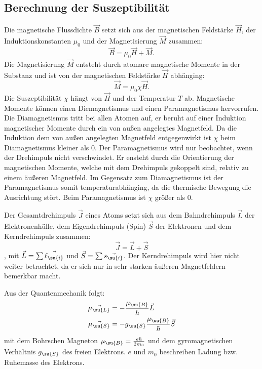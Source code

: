 \subsection{Berechnung der Suszeptibilität}
Die magnetische Flussdichte $\vec{B}$ setzt sich aus der magnetischen Feldstärke
$\vec{H}$, der Induktionskonstanten $\mu_0$ und der Magnetisierung $\vec{M}$
zusammen:
\begin{equation}
  \vec{B} = \mu_0 \vec{H} + \vec{M}.
\end{equation}
Die Magnetisierung $\vec{M}$ entsteht durch atomare magnetische Momente in der
Substanz und ist von der magnetischen Feldstärke $\vec{H}$ abhänging:
\begin{equation}
  \vec{M} = \mu_0 \chi \vec{H}.
\end{equation}
Die Suszeptibilität $\chi$ hängt von $\vec{H}$ und der Temperatur $T$ ab.
Magnetische Momente können einen Diemagnetismus und einen Paramagnetismus
hervorrufen. Die Diamagnetismus tritt bei allen Atomen auf, er beruht auf einer
Induktion magnetischer Momente durch ein von außen angelegtes Magnetfeld.
Da die Induktion dem von außen angelegten Magnetfeld entgegenwirkt ist $\chi$
beim Diamagnetismus kleiner als 0. Der Paramagnetismus wird nur beobachtet, wenn
der Drehimpuls nicht verschwindet. Er ensteht durch die Orientierung der
magnetischen Momente, welche mit dem Drehimpuls gekoppelt sind, relativ zu einem
äußeren Magnetfeld. Im Gegensatz zum Diamagnetismus ist der Paramagnetismus somit
temperaturabhänging, da die thermische Bewegung die Ausrichtung stört. Beim
Paramagnetismus ist $\chi$ größer als 0.

Der Gesamtdrehimpuls $\vec{J}$ eines Atoms setzt sich aus dem Bahndrehimpuls $\vec{L}$
der Elektronenhülle, dem Eigendrehimpuls (Spin) $\vec{S}$ der Elektronen und dem
Kerndrehimpuls zusammen:
\begin{equation}
  \vec{J} = \vec{L} + \vec{S}
\end{equation}
, mit $\vec{L} = \sum \vec{\ell_\su{i}}$ und $\vec{S} = \sum \vec{s_\su{i}}$.
Der Kerndrehimpuls wird hier nicht weiter betrachtet,
da er sich nur in sehr starken äußeren Magnetfeldern bemerkbar macht.

Aus der Quantenmechanik folgt:
\begin{align}
  \vec{\mu_\su{L}} &= -\frac{\mu_\su{B}}{\hbar} \vec{L} \\
  \vec{\mu_\su{S}} &= -g_\su{S}\frac{\mu_\su{B}}{\hbar} \vec{S}
\end{align}
mit dem Bohrschen Magneton $\mu_\su{B} = \frac{e \hbar}{2m_0}$ und dem
gyromagnetischen Verhältnis $g_\su{S}$ des freien Elektrons. $e$ und $m_0$
beschreiben Ladung bzw. Ruhemasse des Elektrons.

